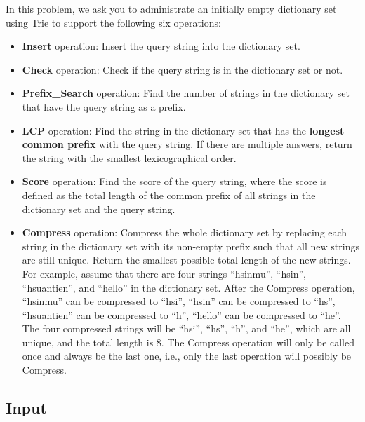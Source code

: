 In this problem, we ask you to administrate an initially empty dictionary set using Trie to support the following six operations:
\begin{itemize}
    \item \textbf{Insert} operation: Insert the query string into the dictionary set.
    \item \textbf{Check} operation: Check if the query string is in the dictionary set or not.
    \item \textbf{Prefix\_Search} operation: Find the number of strings in the dictionary set that have the query string as a prefix.
    \item \textbf{LCP} operation: Find the string in the dictionary set that has the \textbf{longest common prefix} with the query string. If there are multiple answers, return the string with the smallest lexicographical order.
    \item \textbf{Score} operation: Find the score of the query string, where the score is defined as the total length of the common prefix of all strings in the dictionary set and the query string.
    \item \textbf{Compress} operation: Compress the whole dictionary set by replacing each string in the dictionary set with its non-empty prefix such that all new strings are still unique. Return the smallest possible total length of the new strings. For example, assume that there are four strings ``hsinmu'', ``hsin'', ``hsuantien'', and ``hello'' in the dictionary set. After the Compress operation, ``hsinmu'' can be compressed to ``hsi'', ``hsin'' can be compressed to ``hs'', ``hsuantien'' can be compressed to ``h'', ``hello'' can be compressed to ``he''. The four compressed strings will be ``hsi'', ``hs'', ``h'', and ``he'', which are all unique, and the total length is 8. The Compress operation will only be called once and always be the last one, i.e., only the last operation will possibly be Compress.

\end{itemize}

\subsection{Input}\label{input}

